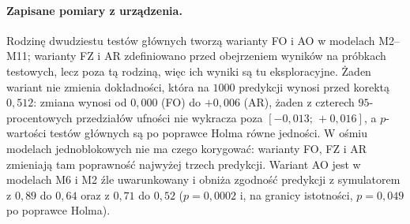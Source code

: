 \paragraph{Zapisane pomiary z urządzenia.}
Rodzinę dwudziestu testów głównych tworzą warianty FO i AO w modelach M2--M11; warianty FZ i AR zdefiniowano przed obejrzeniem wyników na próbkach testowych, lecz poza tą rodziną, więc ich wyniki są tu eksploracyjne.
Żaden wariant nie zmienia dokładności, która na $1000$ predykcji wynosi przed korektą $0{,}512$: zmiana wynosi od $0{,}000$ (FO) do $+0{,}006$ (AR), żaden z czterech $95$-procentowych przedziałów ufności nie wykracza poza $[-0{,}013;\,+0{,}016]$, a $p$-wartości testów głównych są po poprawce Holma równe jedności.
W ośmiu modelach jednoblokowych nie ma czego korygować: warianty FO, FZ i AR zmieniają tam poprawność najwyżej trzech predykcji.
Wariant AO jest w modelach M6 i M2 źle uwarunkowany i obniża zgodność predykcji z symulatorem z $0{,}89$ do $0{,}64$ oraz z $0{,}71$ do $0{,}52$ ($p=0{,}0002$ i, na granicy istotności, $p=0{,}049$ po poprawce Holma).

